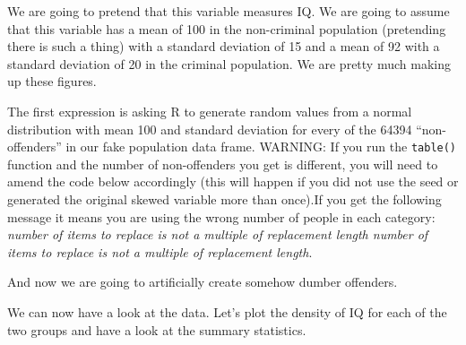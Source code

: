 \documentclass[
]{book}
\newenvironment{Shaded}{\begin{snugshade}}{\end{snugshade}}
\newcommand{\AttributeTok}[1]{\textcolor[rgb]{0.13,0.29,0.53}{#1}}
\newcommand{\DecValTok}[1]{\textcolor[rgb]{0.00,0.00,0.81}{#1}}
\newcommand{\FunctionTok}[1]{\textcolor[rgb]{0.13,0.29,0.53}{\textbf{#1}}}
\newcommand{\NormalTok}[1]{#1}
\newcommand{\OtherTok}[1]{\textcolor[rgb]{0.56,0.35,0.01}{#1}}
\newcommand{\SpecialCharTok}[1]{\textcolor[rgb]{0.81,0.36,0.00}{\textbf{#1}}}
\newcommand{\StringTok}[1]{\textcolor[rgb]{0.31,0.60,0.02}{#1}}
\begin{document}
We are going to pretend that this variable measures IQ. We are going to assume that this variable has a mean of 100 in the non-criminal population (pretending there is such a thing) with a standard deviation of 15 and a mean of 92 with a standard deviation of 20 in the criminal population. We are pretty much making up these figures.

The first expression is asking R to generate random values from a normal distribution with mean 100 and standard deviation for every of the 64394 ``non-offenders'' in our fake population data frame. WARNING: If you run the \texttt{table()} function and the number of non-offenders you get is different, you will need to amend the code below accordingly (this will happen if you did not use the seed or generated the original skewed variable more than once).If you get the following message it means you are using the wrong number of people in each category: \emph{number of items to replace is not a multiple of replacement length number of items to replace is not a multiple of replacement length}.

\begin{Shaded}
\end{Shaded}

And now we are going to artificially create somehow dumber offenders.

\begin{Shaded}
\end{Shaded}

We can now have a look at the data. Let's plot the density of IQ for each of the two groups and have a look at the summary statistics.
\end{document}
